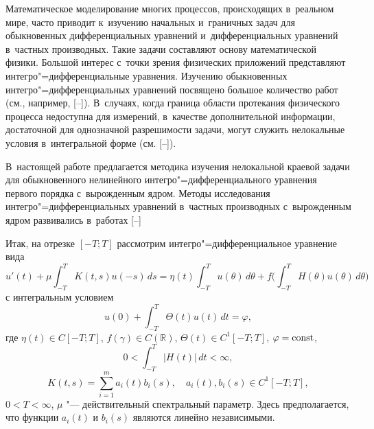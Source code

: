 
\date{23/VII/2016} %



\makerutitle

Математическое моделирование многих процессов, происходящих в~реальном мире, часто приводит к~изучению начальных и~граничных задач для обыкновенных дифференциальных уравнений и~дифференциальных уравнений в~частных производных. Такие задачи составляют основу математической физики. 
Большой интерес с~точки зрения физических приложений представляют  интегро"=дифференциальные уравнения. 
Изучению обыкновенных интегро"=дифференциальных уравнений посвящено большое количество работ (см., например, 
[--]).
В~случаях, когда граница области протекания физического процесса недоступна для измерений, в~качестве дополнительной информации, достаточной для однозначной разрешимости задачи, могут служить нелокальные условия в~интегральной форме (см. [--]). 

В~настоящей работе предлагается методика изучения нелокальной краевой задачи для обыкновенного нелинейного интегро"=дифференциального уравнения первого порядка с~вырожденным ядром. 
Методы исследования интегро"=дифференциальных уравнений в~частных производных с~вырожденным ядром развивались в~работах [--] 

Итак,  на отрезке
$ [-T ; T] $ рассмотрим интегро"=дифференциальное уравнение вида
\begin{equation}
u' (t)+\mu  \int _{-T}^T K  (t , s)  u (-s) \, d s=
\eta (t)  \int _{-T}^T u(\theta) \, d \theta+
f \biggl( \int _{-T}^T  H (\theta)  u (\theta) \, d \theta \biggr) \label{tur1}
\end{equation}
с интегральным условием
\begin {equation}
\label{tur2}
u (0)+ \int _{-T}^T \Theta (t)  u(t) \, d t=\varphi ,
\end{equation}
где $ \eta (t) \in C [-T ; T]$, $f (\gamma) \in C (\mathbb R) $,  
$ \Theta (t)  \in C^{ 1 } [-T ; T]$, 
$ \varphi=\rm const $, 
$$0< \int _{-T}^T | H (t) | \, d t<\infty ,$$ 
$$K (t , s)=\sum \limits_{i=1}^{m} a_{ i} (t)  b_{ i} (s) ,\quad  a_{i} (t) ,  b_{ i} (s) \in C^{ 1 }[-T ; T],$$ $0<T<\infty$,  $\mu $ 
"--- действительный спектральный параметр. 
Здесь предполагается, что функции $a_{i} (t)$ и $b_{i} (s)$ являются линейно независимыми.


